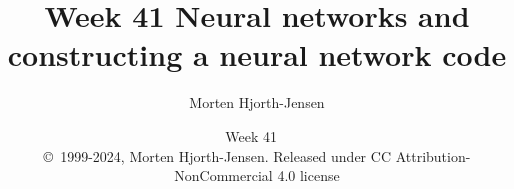 \documentclass{beamer}
\begin{document}

\newcommand{\exercisesection}[1]{\subsection*{#1}}







\title{Week 41 Neural networks and constructing a neural network code}


\author{Morten Hjorth-Jensen}

\date{Week 41
\ \\ 
{\tiny \copyright\ 1999-2024, Morten Hjorth-Jensen. Released under CC Attribution-NonCommercial 4.0 license}
}

\begin{frame}
\titlepage
\end{frame}
\end{document}
